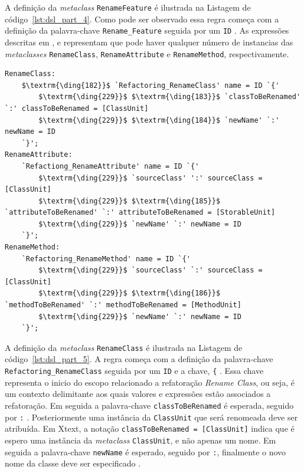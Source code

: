 A definição da \textit{metaclass} \texttt{RenameFeature} é ilustrada na Listagem de código~\ref{lst:dsl_part_4}. Como pode ser observado essa regra começa com a definição da palavra-chave \texttt{Rename\_Feature} seguida por um \texttt{ID} . As expressões descritas em ,  e  representam que pode haver qualquer número de instancias das \textit{metaclasses} \texttt{RenameClass}, \texttt{RenameAttribute} e \texttt{RenameMethod}, respectivamente. 

\begin{lstlisting}[language=Xtext, frame=single, basicstyle=\scriptsize, mathescape=true, label={lst:dsl_part_5}, caption={Gramática da DSL - parte 5}]
RenameClass: 
	$\textrm{\ding{182}}$ `Refactoring_RenameClass' name = ID `{'
		$\textrm{\ding{229}}$ $\textrm{\ding{183}}$ `classToBeRenamed' `:' classToBeRenamed = [ClassUnit]
		$\textrm{\ding{229}}$ $\textrm{\ding{184}}$ `newName' `:' newName = ID
	`}';
RenameAttribute: 
	`Refactiong_RenameAttribute' name = ID `{'
		$\textrm{\ding{229}}$ `sourceClass' ':' sourceClass = [ClassUnit]
		$\textrm{\ding{229}}$ $\textrm{\ding{185}}$ `attributeToBeRenamed' `:' attributeToBeRenamed = [StorableUnit]
		$\textrm{\ding{229}}$ `newName' `:' newName = ID
	`}';
RenameMethod: 
	`Refactoring_RenameMethod' name = ID `{'
		$\textrm{\ding{229}}$ `sourceClass' `:' sourceClass = [ClassUnit]
		$\textrm{\ding{229}}$ $\textrm{\ding{186}}$ `methodToBeRenamed' `:' methodToBeRenamed = [MethodUnit]
		$\textrm{\ding{229}}$ `newName' `:' newName = ID
	`}';
\end{lstlisting}

A definição da \textit{metaclass} \texttt{RenameClass} é ilustrada na Listagem de código~\ref{lst:dsl_part_5}. A regra começa com a definição da palavra-chave \texttt{Refactoring\_RenameClass} seguida por um \texttt{ID} e a chave, \texttt{\{} . Essa chave representa o inicio do escopo relacionado a refatoração \textit{Rename Class}, ou seja, é um contexto delimitante aos quais valores e expressões estão associados a refatoração. Em seguida a palavra-chave \texttt{classToBeRenamed} é esperada, seguido por \texttt{:} . Posteriormente uma instância da \texttt{ClassUnit} que será renomeada deve ser atribuída. Em Xtext, a notação \texttt{classToBeRenamed = [ClassUnit]} indica que é espero uma instância da \textit{metaclass} \texttt{ClassUnit}, e não apenas um nome. Em seguida a palavra-chave \texttt{newName} é esperado, seguido por \texttt{:}, finalmente o novo nome da classe deve ser especificado .

